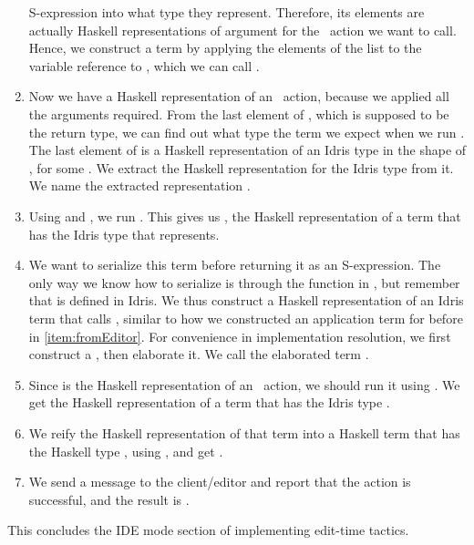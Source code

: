 \begin{enumerate}
    S-expression into what type they represent. Therefore, its elements are
    actually Haskell representations of argument for the \Elab\ action we want
    to call. Hence, we construct a term by applying the elements of the list to
    the variable reference to , which we can call .
  \item \label{item:extract}
    Now we have a Haskell representation of an \Elab\ action, because we
    applied all the arguments required.  From the last element of
    , which is supposed to be the return type, we can find out
    what type the term we expect when we run .  The last element of
     is a Haskell representation of an Idris type in the shape of
    \texttt{ }, for some . We extract the Haskell
    representation for the Idris type  from it.  We name the extracted
    representation .
  \item Using  and , we run . This
    gives us , the Haskell representation of a term that has the Idris
    type that  represents.
  \item We want to serialize this term before returning it as an S-expression.
    The only way we know how to serialize is through the  function
    in , but remember that  is defined in Idris.
    We thus construct a Haskell representation of an Idris term that calls
    , similar to how we constructed an application term for
     before in \autoref{item:fromEditor}.
    For convenience in implementation resolution, we first construct a
    , then elaborate it. We call the elaborated term .
  \item Since  is the Haskell representation of an \Elab\ action, we
    should run it using . We get the Haskell
    representation of a term that has the Idris type .
  \item We reify the Haskell representation of that term into a Haskell term
    that has the Haskell type , using , and get
    .
  \item We send a message to the client/editor and report that the action is
    successful, and the result is .
\end{enumerate}

\noindent This concludes the IDE mode section of implementing edit-time tactics.

